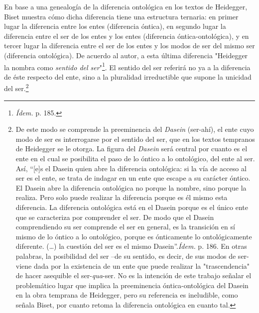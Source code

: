 \documentclass{book}
\begin{document}
En base a una genealogía de la diferencia ontológica en los textos de
Heidegger, Biset muestra cómo dicha diferencia tiene una estructura
ternaria: en primer lugar la diferencia entre los entes (diferencia
óntica), en segundo lugar la diferencia entre el ser de los entes y los
entes (diferencia óntica-ontológica), y en tercer lugar la diferencia
entre el ser de los entes y los modos de ser del mismo ser (diferencia
ontológica). De acuerdo al autor, a esta última diferencia "Heidegger la
nombra como \emph{sentido del ser}"\footnote{\emph{Ídem.} p. 185.}. El
sentido del ser referirá no ya a la diferencia de éste respecto del
ente, sino a la pluralidad irreductible que supone la unicidad del
ser.\footnote{De este modo se comprende la preeminencia del
  \emph{Dasein} (ser-ahí), el ente cuyo modo de ser es interrogarse por
  el sentido del ser, que en los textos tempranos de Heidegger se le
  otorga. La figura del \emph{Dasein} será central por cuanto es el ente
  en el cual se posibilita el paso de lo óntico a lo ontológico, del
  ente al ser. Así, ``{[}e{]}s el Dasein quien abre la diferencia
  ontológica: si la vía de acceso al ser es el ente, se trata de indagar
  en un ente que escape a su carácter óntico. El Dasein abre la
  diferencia ontológica no porque la nombre, sino porque la realiza.
  Pero solo puede realizar la diferencia porque es él mismo esta
  diferencia. La diferencia ontológica está en el Dasein porque es el
  único ente que se caracteriza por comprender el ser. De modo que el
  Dasein comprendiendo su ser comprende el ser en general, es la
  transición en sí mismo de lo óntico a lo ontológico, porque es
  ónticamente lo ontológicamente diferente. (\dots) la cuestión del
  ser es el mismo Dasein''.\emph{Ídem.} p. 186. En otras palabras, la
  posibilidad del ser --de su sentido, es decir, de sus modos de ser-
  viene dada por la existencia de un ente que puede realizar la
  "trascendencia" de hacer asequible el ser-\emph{qua}-ser. No es la
  intención de este trabajo señalar el problemático lugar que implica la
  preeminencia óntica-ontológica del Dasein en la obra temprana de
  Heidegger, pero su referencia es ineludible, como señala Biset, por
  cuanto retoma la diferencia ontológica en cuanto tal.}
\end{document}

